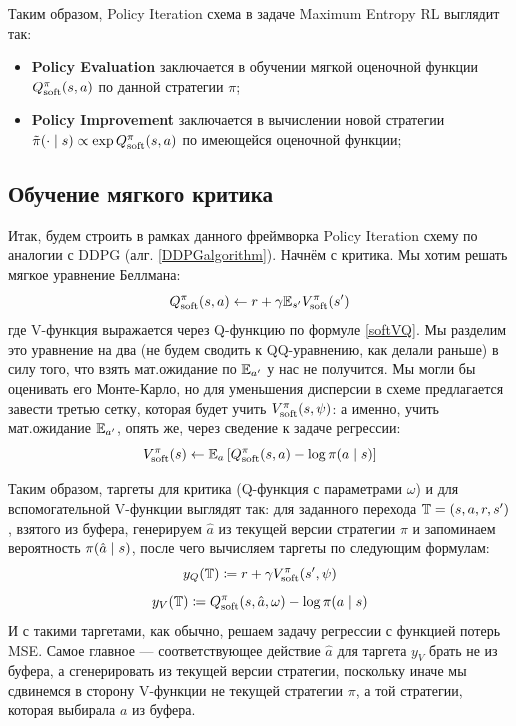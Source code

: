 Таким образом, Policy Iteration схема в задаче Maximum Entropy RL выглядит так:
\begin{itemize}
    \item \textbf{Policy Evaluation} заключается в обучении мягкой оценочной функции $Q^{\pi}_{\mathrm{soft}}(s, a)$ по данной стратегии $\pi$;
    \item \textbf{Policy Improvement} заключается в вычислении новой стратегии $\tilde{\pi}(\cdot \mid s) \propto \exp Q^{\pi}_{\mathrm{soft}}(s, a)$ по имеющейся оценочной функции;
\end{itemize}

\subsection{Обучение мягкого критика}

Итак, будем строить в рамках данного фреймворка Policy Iteration схему по аналогии с DDPG (алг. \ref{DDPGalgorithm}). Начнём с критика. Мы хотим решать мягкое уравнение Беллмана:
$$Q^\pi_{\mathrm{soft}}(s, a) \leftarrow r + \gamma \mathbb{E}_{s'} V_{\mathrm{soft}}^\pi(s') $$
где V-функция выражается через Q-функцию по формуле \eqref{softVQ}. Мы разделим это уравнение на два (не будем сводить к QQ-уравнению, как делали раньше) в силу того, что взять мат.ожидание по $\mathbb{E}_{a'}$ у нас не получится. Мы могли бы оценивать его Монте-Карло, но для уменьшения дисперсии в схеме предлагается завести третью сетку, которая будет учить $V^\pi_{\mathrm{soft}}(s, \psi)$: а именно, учить мат.ожидание $\mathbb{E}_{a'}$, опять же, через сведение к задаче регрессии:
$$V_{\mathrm{soft}}^\pi(s) \leftarrow \mathbb{E}_{a} \left[ Q^\pi_{\mathrm{soft}}(s, a) - \log \pi(a \mid s) \right]$$

Таким образом, таргеты для критика (Q-функция с параметрами $\omega$) и для вспомогательной V-функции выглядят так: для заданного перехода $\T \HM= (s, a, r, s')$, взятого из буфера, генерируем $\hat{a}$ из текущей версии стратегии $\pi$ и запоминаем вероятность $\pi(\hat{a} \HM\mid s)$, после чего вычисляем таргеты по следующим формулам:
$$y_Q(\mathbb{T}) \coloneqq r + \gamma V^\pi_{\mathrm{soft}}(s', \psi)$$
$$y_V(\mathbb{T}) \coloneqq Q^\pi_{\mathrm{soft}}(s, \hat{a}, \omega) - \log \pi(a \mid s)$$
И с такими таргетами, как обычно, решаем задачу регрессии с функцией потерь MSE. Самое главное --- соответствующее действие $\hat{a}$ для таргета $y_V$ брать не из буфера, а сгенерировать из текущей версии стратегии, поскольку иначе мы сдвинемся в сторону V-функции не текущей стратегии $\pi$, а той стратегии, которая выбирала $a$ из буфера.


